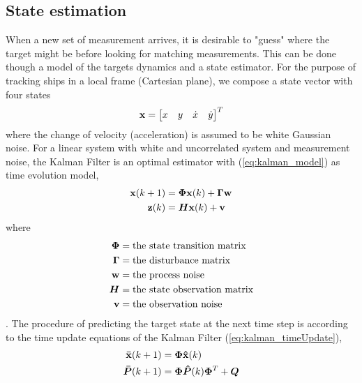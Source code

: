 \subsection{State estimation} %
When a new set of measurement arrives, it is desirable to "guess" where the target might be before looking for matching measurements. This can be done though a model of the targets dynamics and a state estimator. For the purpose of tracking ships in a local frame (Cartesian plane), we compose a state vector with four states
\begin{equation}
\boldsymbol{\mathbf{x}} = \begin{bmatrix}
x & y & \dot{x} & \dot{y}
\end{bmatrix}^T
\label{eq:state_vector}
\end{equation}
where the change of velocity (acceleration) is assumed to be white Gaussian noise. For a linear system with white and uncorrelated system and measurement noise, the Kalman Filter is an optimal estimator with (\ref{eq:kalman_model}) as time evolution model,
\begin{equation}
\begin{split}
\boldsymbol{\mathbf{x}}(k+1) &= \bm{\Phi} \boldsymbol{\mathbf{x}}(k) + \bm{\Gamma} \boldsymbol{\mathbf{w}} \\
\boldsymbol{\mathbf{z}}(k) &= \bm{H} \boldsymbol{\mathbf{x}}(k) + \boldsymbol{\mathbf{v}}
\end{split}
\label{eq:kalman_model}
\end{equation}
where
\begin{equation}
\begin{split}
\bm{\Phi} 	&= \text{the state transition matrix} \\
\bm{\Gamma}	&= \text{the disturbance matrix} \\
\boldsymbol{\mathbf{w}}		&= \text{the process noise} \\
\bm{H} 		&= \text{the state observation matrix} \\
\boldsymbol{\mathbf{v}} 		&= \text{the observation noise} \\
\end{split}
\end{equation}.
The procedure of predicting the target state at the next time step is according to the time update equations of the Kalman Filter (\ref{eq:kalman_timeUpdate}),
\begin{equation}
\begin{split}
\boldsymbol{\mathbf{\bar{x}}}(k+1) 	&= \bm{\Phi} \boldsymbol{\mathbf{\hat{x}}}(k) \\
\bm{\bar{P}}(k+1)	&= \bm{\Phi} \bm{\hat{P}}(k)  \bm{\Phi}^T + \bm{Q} \\
\end{split}
\label{eq:kalman_timeUpdate}
\end{equation}
